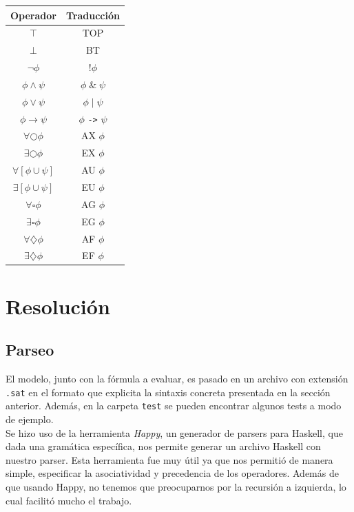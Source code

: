 \documentclass[11pt]{article}
\begin{document}
\begin{center}
  \begin{tabular}{ | c | c |}
   \hline
   \textbf{Operador} & \textbf{Traducción}  \\
   \hline 
   $\top$ & TOP  \\  
   \hline
   $\bot$ & BT   \\
   \hline
   $\neg \phi$ & !$\phi$   \\
   \hline
   $\phi \land \psi$ & $\phi \;  \&  \; \psi$   \\
   \hline
   $\phi \lor \psi$ & $\phi \; | \;  \psi$   \\
   \hline
   $\phi \rightarrow \psi$ & $\phi$ \texttt{->} $\psi$   \\
   \hline
   $\forall \bigcirc \phi$ & AX  $\phi$ \\
   \hline
   $\exists \bigcirc \phi$ & EX  $\phi$ \\
   \hline
   $\forall [\phi \cup \psi]$ & AU $\phi$  \\
   \hline
   $\exists [\phi \cup \psi]$ & EU $\phi$  \\
   \hline
   $\forall \square \phi$ & AG   $\phi$\\
   \hline
   $\exists \square \phi$ & EG   $\phi$\\
   \hline
   $\forall \diamondsuit \phi$ & AF $\phi$  \\
   \hline
   $\exists \diamondsuit \phi$ & EF $\phi$   \\
   \hline
  \end{tabular}
  \end{center} 

\section{Resolución}

\subsection{Parseo}

El modelo, junto con la fórmula a evaluar, es pasado en un archivo con
extensión \texttt{.sat} en el formato que explicita la sintaxis concreta
presentada en la sección anterior. Además, en la carpeta \texttt{test}
se pueden encontrar algunos tests a modo de ejemplo. \\

Se hizo uso de la herramienta \emph{Happy}, un generador de parsers
para Haskell, que dada una gramática específica, nos permite generar
un archivo Haskell con nuestro parser. Esta herramienta fue muy útil
ya que nos permitió de manera simple, especificar la asociatividad y
precedencia de los operadores. Además de que usando Happy, no 
tenemos que preocuparnos por la recursión a izquierda, lo cual
facilitó mucho el trabajo. \\
\end{document}
